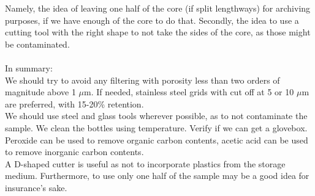 \documentclass[twocolumn,a4paper,aps,amsmath,amssymb,floatfix,superscriptaddress]{revtex4-2}
\begin{document}
	Namely, the idea of leaving one half of the core (if split lengthways) for archiving purposes, if we have enough of the core to do that. Secondly, the idea to use a cutting tool with the right shape to not take the sides of the core, as those might be contaminated.\\
	\\
	In summary:\\
	We should try to avoid any filtering with porosity less than two orders of magnitude above 1 $\mu$m. If needed, stainless steel grids with cut off at 5 or 10 $\mu$m are preferred, with 15-20\% retention.\\
	We should use steel and glass tools wherever possible, as to not contaminate the sample.
	We clean the bottles using temperature. Verify if we can get a glovebox.\\
	Peroxide can be used to remove organic carbon contents, acetic acid can be used to remove inorganic carbon contents.\\
	A D-shaped cutter is useful as not to incorporate plastics from the storage medium. Furthermore, to use only one half of the sample may be a good idea for insurance's sake.
\end{document}
